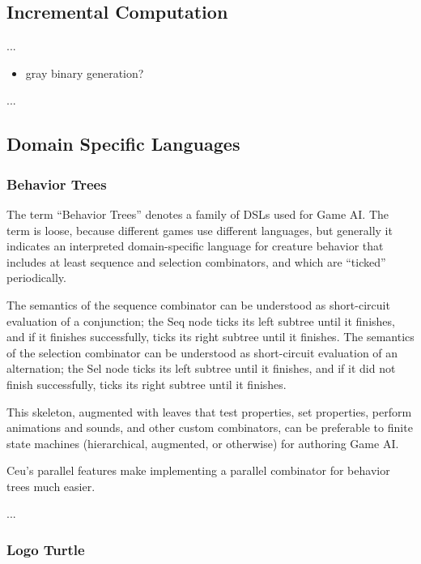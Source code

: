 \documentclass{acm_proc_article-sp}
\begin{document}
\subsection{Incremental Computation}

...

\begin{itemize}
\item gray binary generation?
\end{itemize}

...

\subsection{Domain Specific Languages}

\subsubsection{Behavior Trees}

The term ``Behavior Trees'' denotes a family of DSLs 
used for Game AI.
The term is loose, because different games use different languages,
but generally it indicates an interpreted domain-specific language
for creature behavior that includes at least sequence and selection combinators,
and which are ``ticked'' periodically.

The semantics of the sequence combinator can be understood as short-circuit evaluation of a conjunction;
the Seq node ticks its left subtree until it finishes,
and if it finishes successfully, ticks its right subtree until it finishes.
The semantics of the selection combinator can be understood as short-circuit evaluation of an alternation;
the Sel node ticks its left subtree until it finishes,
and if it did not finish successfully, ticks its right subtree until it finishes.

This skeleton, augmented with leaves that test properties, set properties, perform animations and sounds,
and other custom combinators, can be preferable to finite state machines (hierarchical, augmented, or otherwise) for authoring Game AI.

Ceu's parallel features make implementing a parallel combinator for behavior trees much easier.

...

\subsubsection{Logo Turtle}
\end{document}
